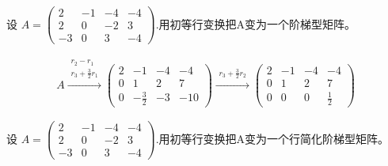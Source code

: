 \documentclass[a4paper]{report}
\begin{document}

\EX 设
$
A=
\begin{pmatrix}
2&-1&-4&-4\\
2&0&-2&3\\
-3&0&3&-4
\end{pmatrix}
$.用初等行变换把A变为一个阶梯型矩阵。

\begin{jie}
\begin{align*}
A\xrightarrow{\substack{r_{2}-r_{1}\\ r_{3}+\frac{3}{2}r_{1}}}
{
\begin{pmatrix}
2&-1&-4&-4\\
0&1&2&7\\
0&-\frac{3}{2}&-3&-10
\end{pmatrix}
}\xrightarrow{\substack{ r_{3}+\frac{3}{2}r_{2}}}
{
\begin{pmatrix}
2&-1&-4&-4\\
0&1&2&7\\
0&0&0&\frac{1}{2}
\end{pmatrix}
}
\end{align*}
\end{jie}

\EX 设
$
A=
\begin{pmatrix}
2&-1&-4&-4\\
2&0&-2&3\\
-3&0&3&-4
\end{pmatrix}
$.用初等行变换把A变为一个行简化阶梯型矩阵。
\end{document}
